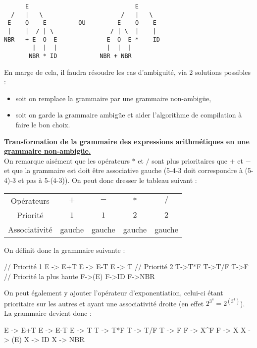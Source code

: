 \documentclass{article}
\newcommand{\stitre}[1]{\noindent\textbf{\underline{#1}}}
\begin{document}
\begin{verbatim}
      E                              E
  /   |   \                      /   |   \
 E    O    E         OU         E    O    E
 |    |  / | \                / | \  |    |
NBR   + E  O  E              E  O  E *    ID
        |  |  |              |  |  |
       NBR * ID            NBR + NBR
\end{verbatim}

En marge de cela, il faudra résoudre les cas d'ambiguité, via 2 solutions possibles :
\begin{itemize}
\item soit on remplace la grammaire par une grammaire non-ambigüe,
\item soit on garde la grammaire ambigüe et aider l'algorithme de compilation à faire le bon choix. \\
\end{itemize}

\stitre{Transformation de la grammaire des expressions arithmétiques en une grammaire non-ambigüe.} \\

On remarque aisément que les opérateurs $*$ et $/$ sont plus prioritaires que $+$ et $-$ et que la grammaire est doit être associative gauche (5-4-3 doit correspondre à 
(5-4)-3 et pas à 5-(4-3)). On peut donc dresser le tableau suivant :
\begin{center}
	\begin{tabular}{|*{5}{c|}}
	\hline
	Opérateurs & $+$ & $-$ & $*$ & $/$ \\
	Priorité & $1$ & $1$ & $2$ & $2$  \\
	Associativité & gauche & gauche & gauche & gauche \\
	\hline
	\end{tabular}
\end{center}

On définit donc la grammaire suivante :
\begin{center}
	\begin{boxedverbatim}
// Priorité 1
E -> E+T
E -> E-T
E -> T
// Priorité 2
T->T*F
T->T/F
T->F
// Priorité la plus haute
F->(E)
F->ID
F->NBR
	\end{boxedverbatim}
\end{center}

On peut également y ajouter l'opérateur d'exponentiation, celui-ci étant prioritaire sur les autres et ayant une associativité droite (en effet $2^{3^4} = 2^{(3^4)}$). La grammaire 
devient donc :
\begin{center}
	\begin{boxedverbatim}
E -> E+T
E -> E-T
E -> T
T -> T*F
T -> T/F
T -> F
F -> X^F
F -> X
X -> (E)
X -> ID
X -> NBR	
	\end{boxedverbatim}
\end{center}
\end{document}
